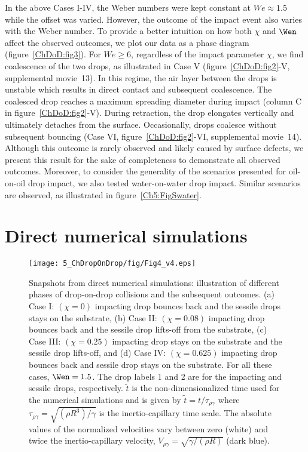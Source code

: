 In the above Cases I-IV, the Weber numbers were kept constant at $We \approx 1.5$ while the offset was varied. However, the outcome of the impact event also varies with the Weber number. To provide a better intuition on how both $\chi$ and $\Wen$ affect the observed outcomes, we plot our data as a phase diagram (figure~\ref{ChDoD:fig3}). For $We \geq 6$, regardless of the impact parameter $\chi$, we find coalescence of the two drops, as illustrated in Case V (figure~\ref{ChDoD:fig2}-V, supplemental movie~{\color{Myfig}13}). In this regime, the air layer between the drops is unstable which results in direct contact and subsequent coalescence. The coalesced drop reaches a maximum spreading diameter during impact (column C in figure~\ref{ChDoD:fig2}-V). During retraction, the drop elongates vertically and ultimately detaches from the surface. Occasionally, drops coalesce without subsequent bouncing (Case VI, figure~\ref{ChDoD:fig2}-VI, supplemental movie~{\color{Myfig}14}). Although this outcome is rarely observed and likely caused by surface defects, we present this result for the sake of completeness to demonstrate all observed outcomes. Moreover, to consider the generality of the scenarios presented for oil-on-oil drop impact, we also tested water-on-water drop impact. Similar scenarios are observed, as illustrated in figure~\ref{Ch5:FigSwater}.

\section{Direct numerical simulations}\label{Ch5:DNS}

\begin{figure}
	\centering
	\texttt{[image: 5\_ChDropOnDrop/fig/Fig4\_v4.eps]}
	\caption{Snapshots from direct numerical simulations: illustration of different phases of drop-on-drop collisions and the subsequent outcomes. (a) Case I: $\left(\chi=0\right)$ impacting drop bounces back and the sessile drops stays on the substrate, (b) Case II: $\left(\chi=0.08\right)$ impacting drop bounces back and the sessile drop lifts-off from the substrate, (c) Case III: $\left(\chi=0.25\right)$ impacting drop stays on the substrate and the sessile drop lifts-off, and (d) Case IV: $\left(\chi=0.625\right)$ impacting drop bounces back and sessile drop stays on the substrate. For all these cases, $\Wen = 1.5$. The drop labels 1 and 2 are for the impacting and sessile drops, respectively. $\tilde{t}$ is the non-dimensionalized time used for the numerical simulations and is given by $\tilde{t} = t/\tau_{\rho\gamma}$ where $\tau_{\rho\gamma} = \sqrt{\left(\rho R^3\right)/\gamma}$ is the inertio-capillary time scale. The absolute values of the normalized velocities vary between zero (white) and twice the inertio-capillary velocity, $V_{\rho\gamma}=\sqrt{\gamma/\left(\rho R\right)}$ (dark blue).}
	\label{ChDoD:fig4}
\end{figure}

